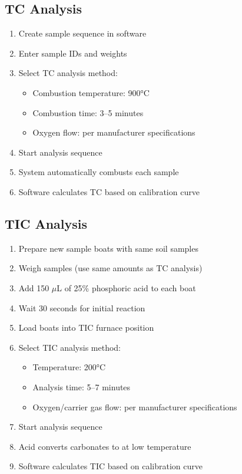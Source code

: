 \documentclass[11pt,a4paper]{article}\usepackage[]{graphicx}\usepackage[]{xcolor}
\begin{document}
\subsection{TC Analysis}
\begin{enumerate}[noitemsep]
    \item Create sample sequence in software
    \item Enter sample IDs and weights
    \item Select TC analysis method:
    \begin{itemize}
        \item Combustion temperature: 900°C
        \item Combustion time: 3--5 minutes
        \item Oxygen flow: per manufacturer specifications
    \end{itemize}
    \item Start analysis sequence
    \item System automatically combusts each sample
    \item Software calculates TC based on calibration curve
\end{enumerate}

\subsection{TIC Analysis}
\begin{enumerate}[noitemsep]
    \item Prepare new sample boats with same soil samples
    \item Weigh samples (use same amounts as TC analysis)
    \item Add 150 $\mu$L of 25\% phosphoric acid to each boat
    \item Wait 30 seconds for initial reaction
    \item Load boats into TIC furnace position
    \item Select TIC analysis method:
    \begin{itemize}
        \item Temperature: 200°C
        \item Analysis time: 5--7 minutes
        \item Oxygen/carrier gas flow: per manufacturer specifications
    \end{itemize}
    \item Start analysis sequence
    \item Acid converts carbonates to  at low temperature
    \item Software calculates TIC based on calibration curve
\end{enumerate}
\end{document}
